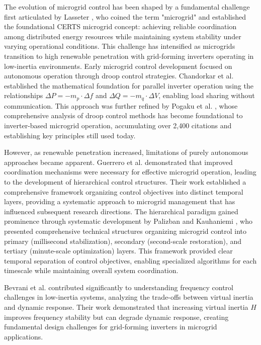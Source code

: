 \documentclass[12pt]{article}
\begin{document}
The evolution of microgrid control has been shaped by a fundamental challenge first articulated by Lasseter \cite{lasseter2002}, who coined the term "microgrid" and established the foundational CERTS microgrid concept: achieving reliable coordination among distributed energy resources while maintaining system stability under varying operational conditions. This challenge has intensified as microgrids transition to high renewable penetration with grid-forming inverters operating in low-inertia environments. Early microgrid control development focused on autonomous operation through droop control strategies. Chandorkar et al. \cite{chandorkar1993} established the mathematical foundation for parallel inverter operation using the relationships $\Delta P = -m_p \cdot \Delta f$ and $\Delta Q = -m_q \cdot \Delta V$, enabling load sharing without communication. This approach was further refined by Pogaku et al. \cite{pogaku2007}, whose comprehensive analysis of droop control methods has become foundational to inverter-based microgrid operation, accumulating over 2,400 citations and establishing key principles still used today.

However, as renewable penetration increased, limitations of purely autonomous approaches became apparent. Guerrero et al. \cite{guerrero2011} demonstrated that improved coordination mechanisms were necessary for effective microgrid operation, leading to the development of hierarchical control structures. Their work established a comprehensive framework organizing control objectives into distinct temporal layers, providing a systematic approach to microgrid management that has influenced subsequent research directions. The hierarchical paradigm gained prominence through systematic development by Palizban and Kauhaniemi \cite{palizban2014,palizban2015}, who presented comprehensive technical structures organizing microgrid control into primary (millisecond stabilization), secondary (second-scale restoration), and tertiary (minute-scale optimization) layers. This framework provided clear temporal separation of control objectives, enabling specialized algorithms for each timescale while maintaining overall system coordination.

Bevrani et al. \cite{bevrani2014} contributed significantly to understanding frequency control challenges in low-inertia systems, analyzing the trade-offs between virtual inertia and dynamic response. Their work demonstrated that increasing virtual inertia $H$ improves frequency stability but can degrade dynamic response, creating fundamental design challenges for grid-forming inverters in microgrid applications.
\end{document}
